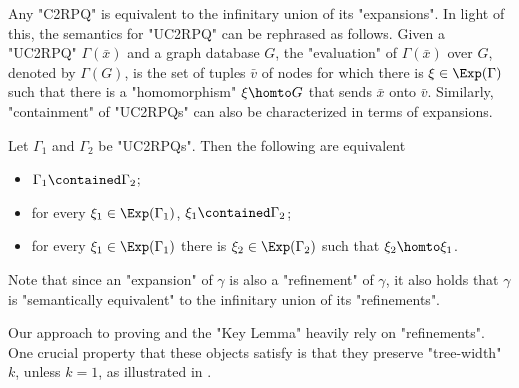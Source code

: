 Any "C2RPQ" is equivalent to the infinitary union of its "expansions". In light of this, the semantics for "UC2RPQ" can be rephrased as follows. 
Given a "UC2RPQ" $\Gamma(\bar x)$ and a graph database $G$, 
the "evaluation" of $\Gamma(\bar x)$ over $G$, denoted by $\Gamma(G)$, is the set of tuples 
$\bar{v}$ of nodes for which there is $\anexpansion \in \Exp(\Gamma)$ such that there is a "homomorphism" $\anexpansion \homto G$ that sends $\bar x$ onto $\bar v$.  
Similarly, "containment" of "UC2RPQs" can also be characterized in terms of expansions.

\begin{proposition}
    \AP\label{prop:cont-char-exp-st} 
    Let $\Gamma_1$ and $\Gamma_2$ be "UC2RPQs". Then the following are equivalent
    \begin{itemize}
        \item $\Gamma_1 \contained \Gamma_2$;
        \item for every $\anexpansion_1\in \Exp(\Gamma_1)$, $\anexpansion_1 \contained \Gamma_2$;
        \item for every $\anexpansion_1\in \Exp(\Gamma_1)$ there is $\anexpansion_2\in \Exp(\Gamma_2)$ such that $\anexpansion_2\homto \anexpansion_1$. 
    \end{itemize}
\end{proposition}

Note that since an "expansion" of $\gamma$ is also a "refinement" of $\gamma$, it also
holds that $\gamma$ is "semantically equivalent" to the infinitary union of its "refinements".

Our approach to proving 
and the "Key Lemma" heavily rely on "refinements". One crucial property
that these objects satisfy is that they preserve "tree-width" $k$, unless $k=1$,
as illustrated in .

